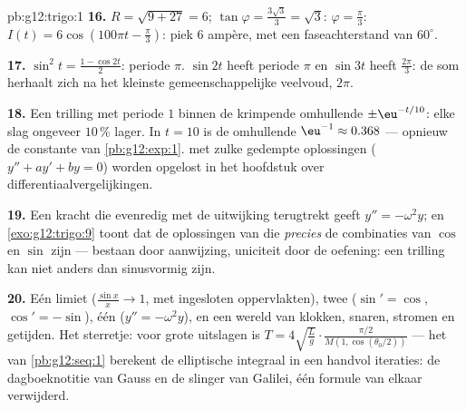 \begin{solution}{pb:g12:trigo:1}
\textbf{16.} $R = \sqrt{9 + 27} = 6$; $\tan\varphi = \frac{3\sqrt3}{3} =
\sqrt3$: $\varphi = \frac\pi3$: $I(t) = 6\cos\left(100\pi t -
\frac\pi3\right)$: piek $6$ ampère, met een faseachterstand van $60^\circ$.

\textbf{17.} $\sin^2 t = \frac{1 - \cos 2t}{2}$: periode $\pi$. $\sin 2t$
heeft periode $\pi$ en $\sin 3t$ heeft $\frac{2\pi}{3}$: de som herhaalt zich
na het kleinste gemeenschappelijke veelvoud, $2\pi$.

\textbf{18.} Een trilling met periode $1$ binnen de krimpende omhullende
$\pm\eu^{-t/10}$: elke slag ongeveer $10\,\%$ lager. In $t = 10$ is de
omhullende $\eu^{-1} \approx 0.368$ --- opnieuw de constante van
\cref{pb:g12:exp:1}.  met zulke gedempte oplossingen
($y'' + a y' + b y = 0$) worden opgelost in het hoofdstuk over
differentiaalvergelijkingen.

\textbf{19.} Een kracht die evenredig met de uitwijking terugtrekt geeft
$y'' = -\omega^2 y$; en \cref{exo:g12:trigo:9} toont dat de oplossingen van
die  \emph{precies} de combinaties van $\cos$ en $\sin$ zijn ---
bestaan door aanwijzing, uniciteit door de oefening: een trilling kan niet
anders dan sinusvormig zijn.

\textbf{20.} Eén limiet ($\frac{\sin x}{x} \to 1$, met ingesloten
oppervlakten), twee  ($\sin' = \cos$, $\cos' = -\sin$), één
 ($y'' = -\omega^2 y$), en een wereld van klokken, snaren,
stromen en getijden. Het sterretje: voor grote uitslagen is
$T = 4\sqrt{\frac Lg} \cdot \frac{\pi/2}{M(1, \cos(\theta_0/2))}$ --- het
  van \cref{pb:g12:seq:1} berekent de
elliptische integraal in een handvol iteraties: de dagboeknotitie van Gauss
en de slinger van Galilei, één formule van elkaar verwijderd.
\end{solution}
